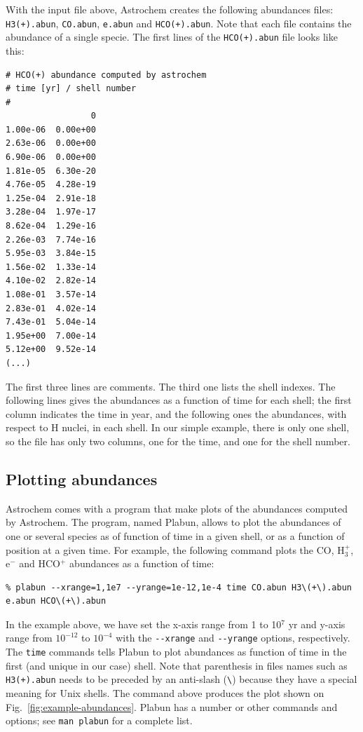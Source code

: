 \documentclass[a4paper,12pt]{article}
\begin{document}
With the input file above, Astrochem creates the following abundances
files: \verb=H3(+).abun=, \verb=CO.abun=, \verb=e.abun= and
\verb=HCO(+).abun=. Note that each file contains the abundance of a
single specie. The first lines of the \verb=HCO(+).abun= file looks
like this:

\begin{verbatim}
# HCO(+) abundance computed by astrochem
# time [yr] / shell number
#
                 0
1.00e-06  0.00e+00
2.63e-06  0.00e+00
6.90e-06  0.00e+00
1.81e-05  6.30e-20
4.76e-05  4.28e-19
1.25e-04  2.91e-18
3.28e-04  1.97e-17
8.62e-04  1.29e-16
2.26e-03  7.74e-16
5.95e-03  3.84e-15
1.56e-02  1.33e-14
4.10e-02  2.82e-14
1.08e-01  3.57e-14
2.83e-01  4.02e-14
7.43e-01  5.04e-14
1.95e+00  7.00e-14
5.12e+00  9.52e-14
(...)
\end{verbatim}

\noindent
The first three lines are comments. The third one lists the shell
indexes. The following lines gives the abundances as a function of
time for each shell; the first column indicates the time in year, and
the following ones the abundances, with respect to H nuclei, in each
shell. In our simple example, there is only one shell, so the file has
only two columns, one for the time, and one for the shell number.

\subsection{Plotting abundances}
\label{sec:plotting-abundances}

Astrochem comes with a program that make plots of the abundances
computed by Astrochem. The program, named Plabun, allows to plot the
abundances of one or several species as of function of time in a given
shell, or as a function of position at a given time. For example, the
following command plots the CO, H$_{3}^{+}$, e$^{-}$ and HCO$^{+}$
abundances as a function of time:

\begin{verbatim}
% plabun --xrange=1,1e7 --yrange=1e-12,1e-4 time CO.abun H3\(+\).abun
e.abun HCO\(+\).abun
\end{verbatim}

In the example above, we have set the x-axis range from 1 to 10$^{7}$
yr and y-axis range from $10^{-12}$ to $10^{-4}$ with the
\verb=--xrange= and \verb=--yrange= options, respectively. The
\verb=time= commands tells Plabun to plot abundances as function of
time in the first (and unique in our case) shell. Note that
parenthesis in files names such as \verb=H3(+).abun= needs to be
preceded by an anti-slash (\verb=\=) because they have a special
meaning for Unix shells. The command above produces the plot shown on
Fig.~\ref{fig:example-abundances}. Plabun has a number or other
commands and options; see \verb=man plabun= for a complete list.
\end{document}

